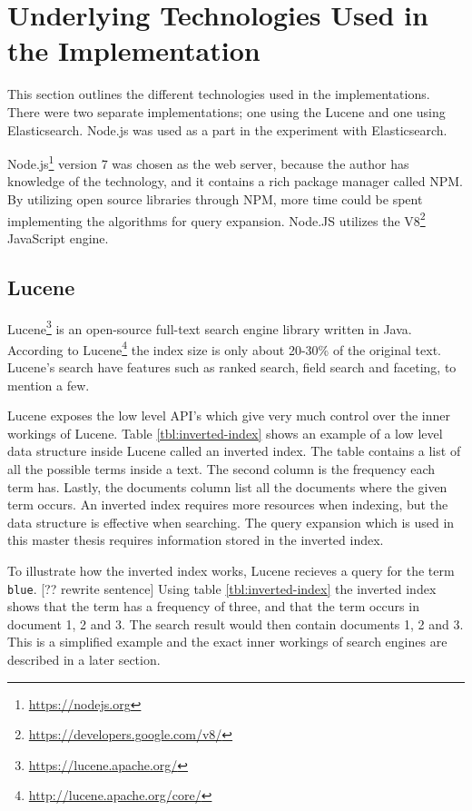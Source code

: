 \section{Underlying Technologies Used in the Implementation}
This section outlines the different technologies used in the implementations.
There were two separate implementations;
one using the Lucene and one using Elasticsearch.
Node.js was used as a part in the experiment with Elasticsearch.

Node.js\footnote{\url{https://nodejs.org}} version 7 was chosen as the web server,
because the author has knowledge of the technology,
and it contains a rich package manager called NPM.
By utilizing open source libraries through NPM, more time could be spent implementing the algorithms for query expansion.
Node.JS utilizes the V8\footnote{\url{https://developers.google.com/v8/}} JavaScript engine.

\subsection{Lucene}
Lucene\footnote{\url{https://lucene.apache.org/}} is an open-source full-text search engine library written in Java.
According to Lucene\footnote{\url{http://lucene.apache.org/core/}} the index size is only about 20-30\% of the original text.
Lucene's search have features such as ranked search, field search and faceting, to mention a few.

Lucene exposes the low level API's which give very much control over the inner workings of Lucene.
Table \ref{tbl:inverted-index} shows an example of a low level data structure inside Lucene called an inverted index.
The table contains a list of all the possible terms inside a text.
The second column is the frequency each term has.
Lastly, the documents column list all the documents where the given term occurs.
An inverted index requires more resources when indexing,
but the data structure is effective when searching.
The query expansion which is used in this master thesis requires information stored in the inverted index.

To illustrate how the inverted index works, Lucene recieves a query for the term \texttt{blue}. [?? rewrite sentence]
Using table \ref{tbl:inverted-index} the inverted index shows that the term has a frequency of three,
and that the term occurs in document 1, 2 and 3.
The search result would then contain documents 1, 2 and 3.
This is a simplified example and the exact inner workings of search engines are described in a later section.


